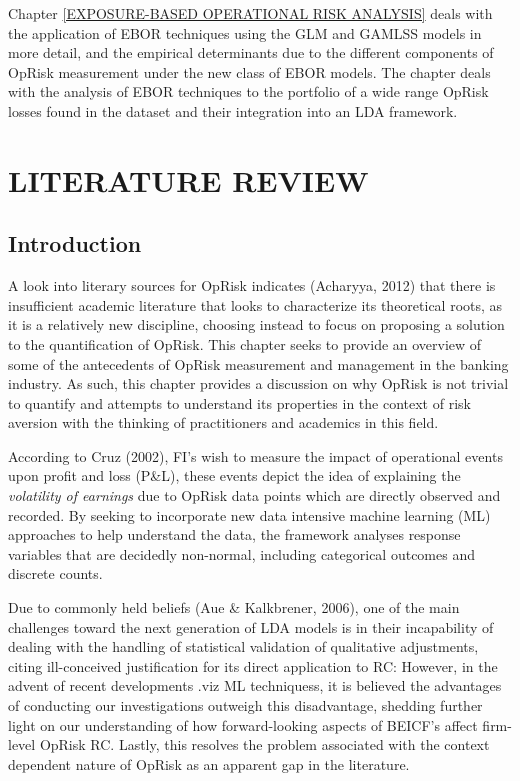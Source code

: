 \documentclass{DissertateUSU}
\begin{document}
Chapter \ref{EXPOSURE-BASED OPERATIONAL RISK ANALYSIS} deals with the
application of EBOR techniques using the GLM and GAMLSS models in more
detail, and the empirical determinants due to the different components
of OpRisk measurement under the new class of EBOR models. The chapter
deals with the analysis of EBOR techniques to the portfolio of a wide
range OpRisk losses found in the dataset and their integration into an
LDA framework.

\FloatBarrier
\newpage
{}
\fancyhead[R]{\thepage}
\fancyfoot[C]{}

\chapter{LITERATURE REVIEW}
\label{LITERATURE REVIEW}

\doublespacing

\section{Introduction}
\label{sec2:Introduction}

A look into literary sources for OpRisk indicates (Acharyya, 2012) that
there is insufficient academic literature that looks to characterize its
theoretical roots, as it is a relatively new discipline, choosing
instead to focus on proposing a solution to the quantification of
OpRisk. This chapter seeks to provide an overview of some of the
antecedents of OpRisk measurement and management in the banking
industry. As such, this chapter provides a discussion on why OpRisk is
not trivial to quantify and attempts to understand its properties in the
context of risk aversion with the thinking of practitioners and
academics in this field.\medskip

According to Cruz (2002), FI's wish to measure the impact of operational
events upon profit and loss (P\&L), these events depict the idea of
explaining the \emph{volatility of earnings} due to OpRisk data points
which are directly observed and recorded. By seeking to incorporate new
data intensive machine learning (ML) approaches to help understand the
data, the framework analyses response variables that are decidedly
non-normal, including categorical outcomes and discrete counts.\medskip

Due to commonly held beliefs (Aue \& Kalkbrener, 2006), one of the main
challenges toward the next generation of LDA models is in their
incapability of dealing with the handling of statistical validation of
qualitative adjustments, citing ill-conceived justification for its
direct application to RC: However, in the advent of recent developments
.viz ML techniquess, it is believed the advantages of conducting our
investigations outweigh this disadvantage, shedding further light on our
understanding of how forward-looking aspects of BEICF's affect
firm-level OpRisk RC. Lastly, this resolves the problem associated with
the context dependent nature of OpRisk as an apparent gap in the
literature.
\end{document}
